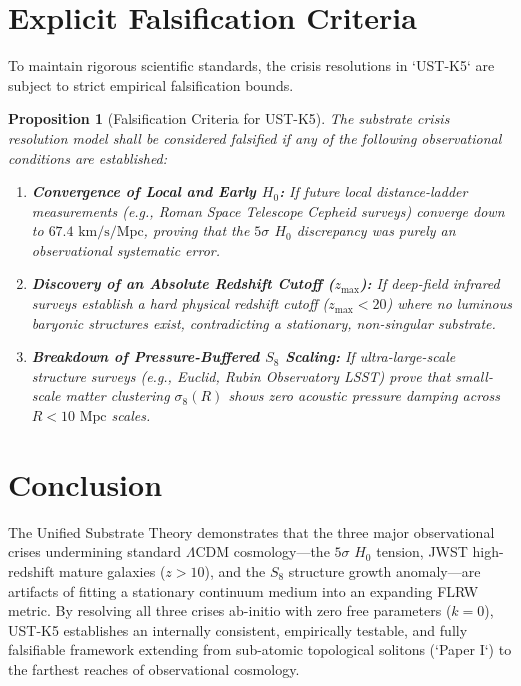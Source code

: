 \documentclass[11pt,a4paper]{article}
\newtheorem{prop}{Proposition}
\begin{document}
	\section{Explicit Falsification Criteria}
	\label{sec:falsification_tests}
	
	To maintain rigorous scientific standards, the crisis resolutions in `UST-K5` are subject to strict empirical falsification bounds.
	
	\begin{prop}[Falsification Criteria for UST-K5]
		\label{prop:falsification_bounds_k5}
		The substrate crisis resolution model shall be considered falsified if any of the following observational conditions are established:
		\begin{enumerate}
			\item \textbf{Convergence of Local and Early $H_0$:} If future local distance-ladder measurements (e.g., Roman Space Telescope Cepheid surveys) converge down to $67.4 \text{ km/s/Mpc}$, proving that the $5\sigma$ $H_0$ discrepancy was purely an observational systematic error.
			\item \textbf{Discovery of an Absolute Redshift Cutoff ($z_{\text{max}}$):} If deep-field infrared surveys establish a hard physical redshift cutoff ($z_{\text{max}} < 20$) where no luminous baryonic structures exist, contradicting a stationary, non-singular substrate.
			\item \textbf{Breakdown of Pressure-Buffered $S_8$ Scaling:} If ultra-large-scale structure surveys (e.g., Euclid, Rubin Observatory LSST) prove that small-scale matter clustering $\sigma_8(R)$ shows zero acoustic pressure damping across $R < 10 \text{ Mpc}$ scales.
		\end{enumerate}
	\end{prop}
	
	\section{Conclusion}
	\label{sec:conclusion}
	
	The Unified Substrate Theory demonstrates that the three major observational crises undermining standard $\Lambda\text{CDM}$ cosmology—the $5\sigma$ $H_0$ tension, JWST high-redshift mature galaxies ($z > 10$), and the $S_8$ structure growth anomaly—are artifacts of fitting a stationary continuum medium into an expanding FLRW metric. By resolving all three crises ab-initio with zero free parameters ($k=0$), UST-K5 establishes an internally consistent, empirically testable, and fully falsifiable framework extending from sub-atomic topological solitons (`Paper I`) to the farthest reaches of observational cosmology.
	
\end{document}
